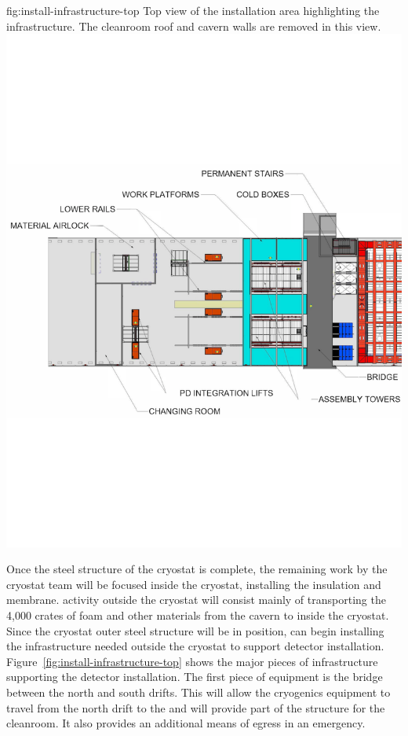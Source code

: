 \begin{dunefigure}{fig:install-infrastructure-top}
  {Top view of the installation area highlighting the infrastructure. The cleanroom roof and cavern walls are removed in this view.}
\includegraphics[width=.85\textwidth,trim=0mm 70mm 0mm 70mm,clip]{graphics/install-infrastructure-top-small.pdf} %
\end{dunefigure}

Once the steel structure of the cryostat is complete, the remaining work by the  cryostat team will be focused inside the cryostat, installing the insulation and membrane.  
 activity outside the cryostat will consist mainly of
transporting the 4,000 crates of foam and other materials from the cavern to inside the cryostat. 
Since the cryostat outer steel structure will be in position,  can 
begin installing the infrastructure needed outside the cryostat to support detector installation. %
Figure~\ref{fig:install-infrastructure-top} shows the major pieces of infrastructure supporting the detector installation.
The first piece of equipment is the bridge between the north and south drifts. 
This will allow the cryogenics equipment to travel from the north drift to the  and will provide part of the structure for the cleanroom. It also provides an additional means of egress in an emergency. 

